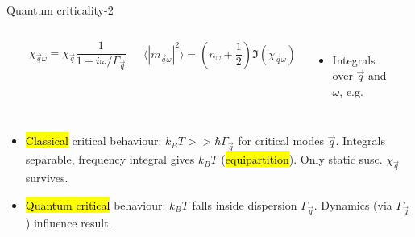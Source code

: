 \begin{frame}[label=quancrit2]{Quantum criticality-2}

\begin{columns}[t]
  \centerline{~}
  \[ \chi_{\vec q \omega} = \chi_{\vec q} \frac{1}{1-i\omega/\Gamma_\vec q} \]

  \[ \langle |m_{\vec q\omega}|^2 \rangle = \left(n_\omega + \frac{1}{2}\right) \Im(\chi_{\vec q \omega}) \]

\begin{itemize}
\item<2->
  Integrals over $\vec q$ and $\omega$, e.g.
\end{itemize}

  \centerline{~}

\end{columns}

\begin{itemize}
\item<3->
  \hl{Classical} critical behaviour: $k_B T >> \hbar \Gamma_\vec q$ for
  critical modes $\vec q$.  Integrals separable, frequency integral
  gives $k_B T$ (\hl{equipartition}). Only static susc.  $\chi_\vec q$
  survives.  

\item<4->
  \hl{Quantum critical} behaviour: $k_B T$ falls inside dispersion
  $\Gamma_\vec q$.  Dynamics (via $\Gamma_\vec q$) influence result.
\end{itemize}

\end{frame}



